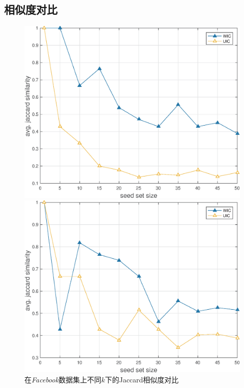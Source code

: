 \subsection{相似度对比}
\label{subsec:compare}
\begin{figure}[ht]
   \begin{minipage}{0.48\textwidth}
     \centering
     \includegraphics[width=\linewidth]{figures/facebookJaccard.eps}
     \caption{在\textit{Facebook}数据集上不同$k$下的Jaccard相似度对比}
     \label{fig:facebookJaccard}
   \end{minipage}
   \hfill
   \begin {minipage}{0.48\textwidth}
     \centering
     \includegraphics[width=\linewidth]{figures/hepPhJaccard.eps}

\end{minipage}
\end{figure}
